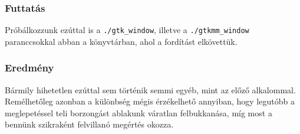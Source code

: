\documentclass[a4paper,10pt]{article}
\begin{document}
\subsubsection{Futtatás}

Próbálkozzunk ezúttal is a \texttt{./gtk\_window}, illetve a \texttt{./gtkmm\_window} paranccsokkal abban a könyvtárban, ahol a fordítást elkövettük.

\subsubsection{Eredmény}

Bármily hihetetlen ezúttal sem történik semmi egyéb, mint az előző alkalommal. Remélhetőleg azonban a különbség mégis érzékelhető annyiban, hogy legutóbb a meglepetéssel teli borzongást ablakunk váratlan felbukkanása, míg most a bennünk szikraként felvillanó megértés okozza.

\nocite{gtktut}
\nocite{gtkmmtut}
\nocite{ggad}
\nocite{gtktutmagy}



\end{document}
